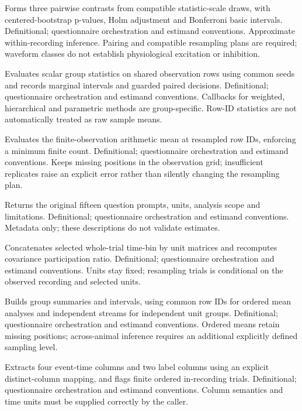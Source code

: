 {Forms three pairwise contrasts from compatible statistic-scale draws, with centered-bootstrap p-values, Holm adjustment and Bonferroni basic intervals.}
{Definitional; questionnaire orchestration and estimand conventions.}
{Approximate within-recording inference. Pairing and compatible resampling plans are required; waveform classes do not establish physiological excitation or inhibition.}

{Evaluates scalar group statistics on shared observation rows using common seeds and records marginal intervals and guarded paired decisions.}
{Definitional; questionnaire orchestration and estimand conventions.}
{Callbacks for weighted, hierarchical and parametric methods are group-specific. Row-ID statistics are not automatically treated as raw sample means.}

{Evaluates the finite-observation arithmetic mean at resampled row IDs, enforcing a minimum finite count.}
{Definitional; questionnaire orchestration and estimand conventions.}
{Keeps missing positions in the observation grid; insufficient replicates raise an explicit error rather than silently changing the resampling plan.}

{Returns the original fifteen question prompts, units, analysis scope and limitations.}
{Definitional; questionnaire orchestration and estimand conventions.}
{Metadata only; these descriptions do not validate estimates.}

{Concatenates selected whole-trial time-bin by unit matrices and recomputes covariance participation ratio.}
{Definitional; questionnaire orchestration and estimand conventions.}
{Units stay fixed; resampling trials is conditional on the observed recording and selected units.}

{Builds group summaries and intervals, using common row IDs for ordered mean analyses and independent streams for independent unit groups.}
{Definitional; questionnaire orchestration and estimand conventions.}
{Ordered means retain missing positions; across-animal inference requires an additional explicitly defined sampling level.}

{Extracts four event-time columns and two label columns using an explicit distinct-column mapping, and flags finite ordered in-recording trials.}
{Definitional; questionnaire orchestration and estimand conventions.}
{Column semantics and time units must be supplied correctly by the caller.}

